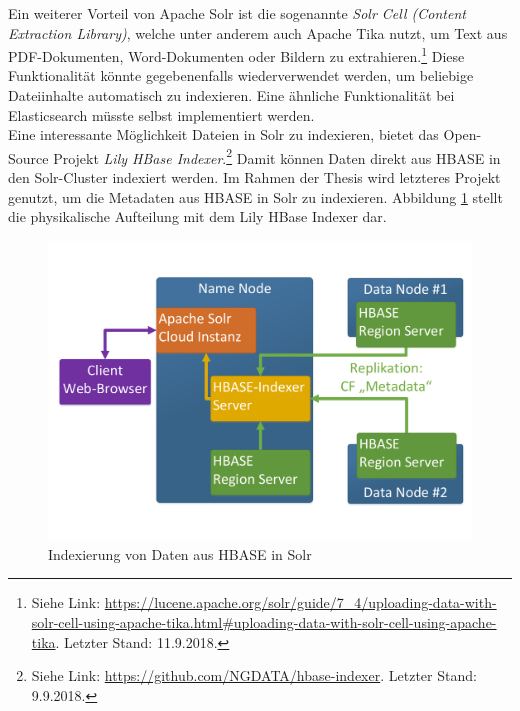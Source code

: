 \noindent
Ein weiterer Vorteil von Apache Solr ist die sogenannte \textit{Solr Cell (Content Extraction Library)}, welche unter anderem auch Apache Tika nutzt, um Text aus PDF-Dokumenten, Word-Dokumenten oder Bildern zu extrahieren.\footnote{Siehe Link: \url{https://lucene.apache.org/solr/guide/7_4/uploading-data-with-solr-cell-using-apache-tika.html\#uploading-data-with-solr-cell-using-apache-tika}. Letzter Stand: 11.9.2018.} Diese Funktionalität könnte gegebenenfalls wiederverwendet werden, um beliebige Dateiinhalte automatisch zu indexieren. Eine ähnliche Funktionalität bei Elasticsearch müsste selbst implementiert werden.\\

\noindent
Eine interessante Möglichkeit Dateien in Solr zu indexieren, bietet das Open-Source Projekt \textit{Lily HBase Indexer}.\footnote{Siehe Link: \url{https://github.com/NGDATA/hbase-indexer}. Letzter Stand: 9.9.2018.} Damit können Daten direkt aus HBASE in den Solr-Cluster indexiert werden. 
Im Rahmen der Thesis wird letzteres Projekt genutzt, um die Metadaten aus HBASE in Solr zu indexieren. Abbildung \ref{fig:hbase_solr_indexing} stellt die physikalische Aufteilung mit dem Lily HBase Indexer dar.\\
\begin{figure}[ht]
  \centering
  \includegraphics[width=\textwidth]{./resource/hbase_solr_indexierung.pdf}
  \caption{Indexierung von Daten aus HBASE in Solr}
  \label{fig:hbase_solr_indexing}
\end{figure}

